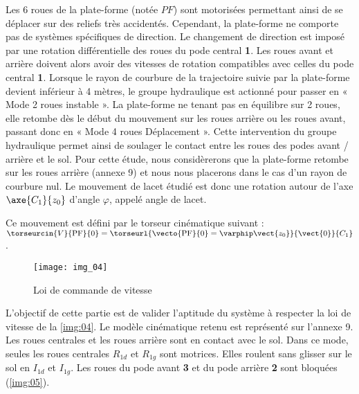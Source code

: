 Les 6 roues de la plate-forme (notée $PF$) sont motorisées permettant ainsi de se déplacer sur des reliefs très
accidentés. Cependant, la plate-forme ne comporte pas de systèmes spécifiques de direction. Le changement de
direction est imposé par une rotation différentielle des roues du pode central \textbf{1}. Les roues avant et arrière doivent alors avoir des vitesses de rotation compatibles avec celles du pode central \textbf{1}. Lorsque le rayon de courbure de la trajectoire suivie par la plate-forme devient inférieur à 4 mètres, le groupe hydraulique est actionné pour passer en « Mode 2 roues instable ». La plate-forme ne tenant pas en équilibre sur 2 roues, elle retombe dès le début du mouvement sur les roues arrière ou les roues avant, passant donc en « Mode 4 roues Déplacement ». Cette intervention du groupe hydraulique permet ainsi de soulager le contact entre les roues des podes avant / arrière et le sol. Pour cette étude, nous considèrerons que la plate-forme retombe sur les roues arrière (annexe 9) et nous nous placerons dans le cas d’un rayon de courbure nul. Le mouvement de lacet étudié est donc une rotation autour de l’axe $\axe{C_1}{z_0}$ d’angle $\varphi$, appelé angle de lacet.

Ce mouvement est défini par le torseur cinématique suivant : 
$\torseurcin{V}{\text{PF}}{0} = \torseurl{\vecto{\text{PF}}{0}=\varphip \vect{z_0}}{\vect{0}}{C_1}$.

\begin{wrapfigure}{r}{5.5cm}
\centering
\texttt{[image: img\_04]}
\caption{Loi de commande de vitesse \label{img:04}}
\end{wrapfigure}L’objectif de cette partie est de valider l’aptitude du système à respecter la
loi de vitesse de la \autoref{img:04}.
Le modèle cinématique retenu est représenté sur l’annexe 9.
Les roues centrales et les roues arrière sont en contact avec le sol. Dans ce
mode, seules les roues centrales $R_{1d}$ et $R_{1g}$ sont motrices. Elles roulent
sans glisser sur le sol en $I_{1d}$ et $I_{1g}$. Les roues du pode avant \textbf{3} et du pode
arrière \textbf{2} sont bloquées (\autoref{img:05}).



